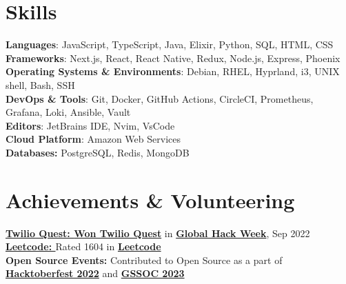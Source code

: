 \documentclass[letterpaper,11pt]{article}
\begin{document}
\section{Skills}
\begin{itemize}[leftmargin=0.15in, label={}]
  \small{\item{
        \textbf{Languages}{: JavaScript, TypeScript, Java, Elixir, Python, SQL, HTML, CSS} \\
        \textbf{Frameworks}{: Next.js, React, React Native, Redux, Node.js, Express, Phoenix} \\
        \textbf{Operating Systems \& Environments}{: Debian, RHEL, Hyprland, i3, UNIX shell, Bash, SSH} \\
        \textbf{DevOps \& Tools}{: Git, Docker, GitHub Actions, CircleCI, Prometheus, Grafana, Loki, Ansible, Vault} \\
        \textbf{Editors}{: JetBrains IDE, Nvim, VsCode} \\
        \textbf{Cloud Platform}{: Amazon Web Services} \\
        \textbf{Databases: }{PostgreSQL, Redis, MongoDB} \\
        }}

\end{itemize}


%
\section{Achievements \& Volunteering}
\begin{itemize}[leftmargin=0.15in, label={}]
  \small{\item{
        \textbf{\href{https://www.twilio.com/en-us}{Twilio Quest: }}{{\textbf{\href{{https://www.twilio.com/en-us}}{Won Twilio Quest}} in \textbf{\href{https://ghw.mlh.io/}{Global Hack Week}}, Sep 2022}} \\
        \textbf{\href{https://leetcode.com/u/ABHIGYAN_MOHANTA/}{Leetcode: }}{Rated 1604 in \href{https://leetcode.com/u/ABHIGYAN_MOHANTA/}{\textbf{Leetcode}}} \\
        \textbf{Open Source Events: }{Contributed to Open Source as a part of \textbf{\href{https://hacktoberfest.com/}{Hacktoberfest 2022}} and \textbf{\href{https://gssoc.girlscript.tech/}{GSSOC 2023}}} \\
        }}

\end{itemize}
\end{document}
